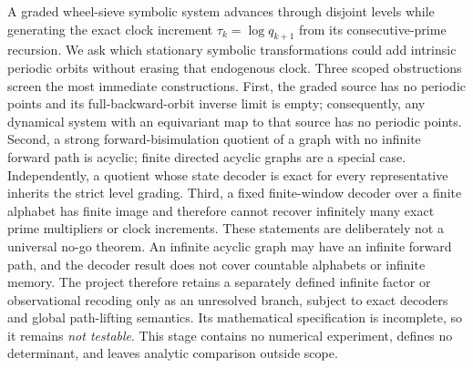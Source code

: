 A graded wheel-sieve symbolic system advances through disjoint levels while
generating the exact clock increment $\tau_k=\log q_{k+1}$ from its
consecutive-prime recursion.  We ask which stationary symbolic
transformations could add intrinsic periodic orbits without erasing that
endogenous clock.  Three scoped obstructions screen the most immediate
constructions.  First, the graded source has no periodic points and its
full-backward-orbit inverse limit is empty; consequently, any dynamical
system with an equivariant map to that source has no periodic points.  Second,
a strong forward-bisimulation quotient of a
graph with no infinite forward path is acyclic; finite directed acyclic
graphs are a special case.  Independently, a quotient whose state decoder is
exact for every representative inherits the strict level grading.  Third, a
fixed finite-window decoder over a finite alphabet has finite image and
therefore cannot recover infinitely many exact prime multipliers or clock
increments.  These statements are deliberately not a universal no-go
theorem.  An infinite acyclic graph may have an infinite forward path, and
the decoder result does not cover countable alphabets or infinite memory.
The project therefore retains a separately defined infinite factor or
observational recoding only as an unresolved branch, subject to exact
decoders and global path-lifting semantics.  Its mathematical specification
is incomplete, so it remains \emph{not testable}.  This stage contains no
numerical experiment, defines no determinant, and leaves analytic comparison
outside scope.
